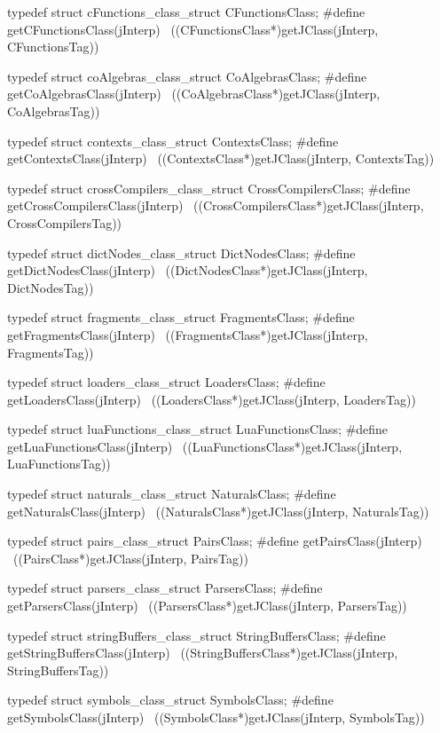 typedef struct cFunctions_class_struct CFunctionsClass;
#define getCFunctionsClass(jInterp)                         \
  ((CFunctionsClass*)getJClass(jInterp, CFunctionsTag))

typedef struct coAlgebras_class_struct CoAlgebrasClass;
#define getCoAlgebrasClass(jInterp)                         \
  ((CoAlgebrasClass*)getJClass(jInterp, CoAlgebrasTag))

typedef struct contexts_class_struct ContextsClass;
#define getContextsClass(jInterp)                           \
  ((ContextsClass*)getJClass(jInterp, ContextsTag))

typedef struct crossCompilers_class_struct CrossCompilersClass;
#define getCrossCompilersClass(jInterp)                     \
  ((CrossCompilersClass*)getJClass(jInterp, CrossCompilersTag))

typedef struct dictNodes_class_struct DictNodesClass;
#define getDictNodesClass(jInterp)                       \
  ((DictNodesClass*)getJClass(jInterp, DictNodesTag))

typedef struct fragments_class_struct FragmentsClass;
#define getFragmentsClass(jInterp)                          \
  ((FragmentsClass*)getJClass(jInterp, FragmentsTag))

typedef struct loaders_class_struct LoadersClass;
#define getLoadersClass(jInterp)                            \
  ((LoadersClass*)getJClass(jInterp, LoadersTag))

typedef struct luaFunctions_class_struct LuaFunctionsClass;
#define getLuaFunctionsClass(jInterp)                       \
  ((LuaFunctionsClass*)getJClass(jInterp, LuaFunctionsTag))

typedef struct naturals_class_struct NaturalsClass;
#define getNaturalsClass(jInterp)                           \
  ((NaturalsClass*)getJClass(jInterp, NaturalsTag))

typedef struct pairs_class_struct PairsClass;
#define getPairsClass(jInterp)                              \
  ((PairsClass*)getJClass(jInterp, PairsTag))

typedef struct parsers_class_struct ParsersClass;
#define getParsersClass(jInterp)                            \
  ((ParsersClass*)getJClass(jInterp, ParsersTag))

typedef struct stringBuffers_class_struct StringBuffersClass;
#define getStringBuffersClass(jInterp)                      \
  ((StringBuffersClass*)getJClass(jInterp, StringBuffersTag))

typedef struct symbols_class_struct SymbolsClass;
#define getSymbolsClass(jInterp)                            \
  ((SymbolsClass*)getJClass(jInterp, SymbolsTag))
  
